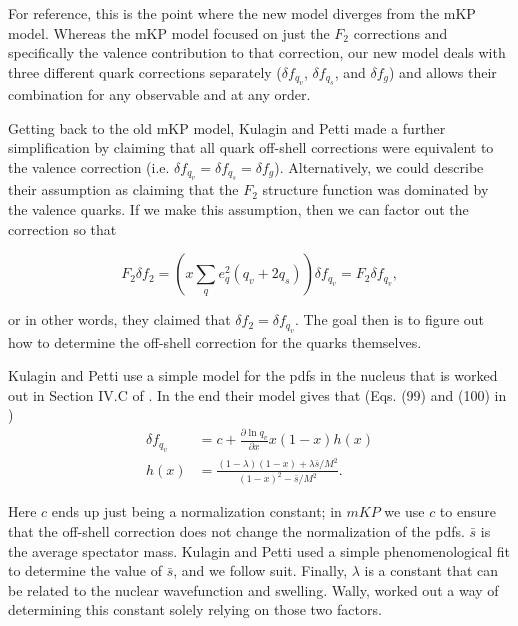 \documentclass[12pt]{article}
\newcommand{\pder}[2]{\frac{\partial #1}{\partial #2}}
\begin{document}
For reference, this is the point where the new model diverges from the mKP model.  Whereas the mKP model focused on just the $F_2$ corrections and specifically the valence contribution to that correction, our new model deals with three different quark corrections separately ($\delta f_{q_v}$, $\delta f_{q_s}$, and $\delta f_{g}$) and allows their combination for any observable and at any order.

Getting back to the old mKP model, Kulagin and Petti made a further simplification by claiming that all quark off-shell corrections were equivalent to the valence correction (i.e. $\delta f_{q_v} = \delta f_{q_s} =\delta f_{g}$).  Alternatively, we could describe their assumption as claiming that the $F_2$ structure function was dominated by the valence quarks.  If we make this assumption, then we can factor out the correction so that

\begin{equation}
\label{eq:quark_expand2}
F_2\delta f_2 = \left(x\sum_{q}e_q^2(q_v+2q_s)\right)\delta f_{q_v} = F_2\delta f_{q_v},
\end{equation}

or in other words, they claimed that $\delta f_2 = \delta f_{q_v}$.  The goal then is to figure out how to determine the off-shell correction for the quarks themselves.

Kulagin and Petti use a simple model for the pdfs in the nucleus that is worked out in Section IV.C of \cite{KP}.  In the end their model gives that (Eqs. (99) and (100) in \cite{KP})
\begin{subequations}
\label{eq:fq}
\begin{align}
\delta f_{q_v} &= c+\pder{\ln{q_v}}{x}x(1-x)h(x)\\
h(x)&=\frac{(1-\lambda)(1-x)+\lambda\bar{s}/M^2}{(1-x)^2-\bar{s}/M^2}.
\end{align}
\end{subequations}

Here $c$ ends up just being a normalization constant; in $mKP$ we use $c$ to ensure that the off-shell correction does not change the normalization of the pdfs.  $\bar{s}$ is the average spectator mass.  Kulagin and Petti used a simple phenomenological fit to determine the value of $\bar{s}$, and we follow suit.  Finally, $\lambda$ is a constant that can be related to the nuclear wavefunction and swelling.  Wally, worked out a way of determining this constant solely relying on those two factors.
\end{document}
